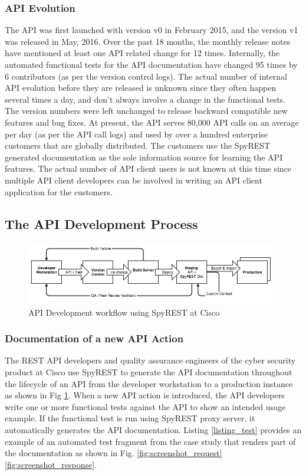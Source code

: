 \documentclass[10pt, conference]{IEEEtran}
\begin{document}
\subsubsection{API Evolution}
The API was first launched with version v0 in February 2015, and the version v1 was released in May, 2016. Over the past 18 months, the monthly release notes have mentioned at least one API related change for 12 times. Internally, the automated functional tests for the API documentation have changed 95 times by 6 contributors (as per the version control logs). The actual number of internal API evolution before they are released is unknown since they often happen several times a day, and don't always involve a change in the functional tests. The version numbers were left unchanged to release backward compatible new features and bug fixes. At present, the API serves 80,000 API calls on an average per day (as per the API call logs) and used by over a hundred enterprise customers that are globally distributed. The customers use the SpyREST generated documentation as the sole information source for learning the API features. The actual number of API client users is not known at this time since multiple API client developers can be involved in writing an API client application for the customers.

\subsection{The API Development Process} %
\begin{figure}[t]
\begin{center}
\includegraphics[width=18cm,keepaspectratio]{spyrestflow.png}
\end{center}
\caption{API Development workflow using SpyREST at Cisco}
\label{fig:spyrest_workflow}
\end{figure}


\subsubsection{Documentation of a new API Action}

The REST API developers and quality assurance engineers of the cyber security product at Cisco use SpyREST to generate the API documentation throughout the lifecycle of an API from the developer workstation to a production instance as shown in Fig \ref{fig:spyrest_workflow}. When a new API action is introduced, the API developers write one or more functional tests against the API to show an intended usage example. If the functional test is run using SpyREST proxy server, it automatically generates the API documentation. Listing \ref{listing_test} provides an example of an automated test fragment from the case study that renders part of the documentation as shown in Fig. \ref{fig:screenshot_request} \ref{fig:screenshot_response}.
\end{document}
